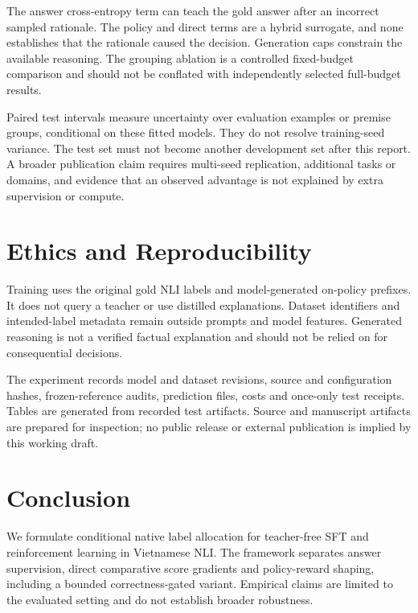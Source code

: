 \documentclass[11pt]{article}
\begin{document}
The answer cross-entropy term can teach the gold answer after an incorrect sampled rationale. The policy and direct terms are a hybrid surrogate, and none establishes that the rationale caused the decision. Generation caps constrain the available reasoning. The grouping ablation is a controlled fixed-budget comparison and should not be conflated with independently selected full-budget results.

Paired test intervals measure uncertainty over evaluation examples or premise groups, conditional on these fitted models. They do not resolve training-seed variance. The test set must not become another development set after this report. A broader publication claim requires multi-seed replication, additional tasks or domains, and evidence that an observed advantage is not explained by extra supervision or compute.

\section{Ethics and Reproducibility}
Training uses the original gold NLI labels and model-generated on-policy prefixes. It does not query a teacher or use distilled explanations. Dataset identifiers and intended-label metadata remain outside prompts and model features. Generated reasoning is not a verified factual explanation and should not be relied on for consequential decisions.

The experiment records model and dataset revisions, source and configuration hashes, frozen-reference audits, prediction files, costs and once-only test receipts. Tables are generated from recorded test artifacts. Source and manuscript artifacts are prepared for inspection; no public release or external publication is implied by this working draft.

\section{Conclusion}
We formulate conditional native label allocation for teacher-free SFT and reinforcement learning in Vietnamese NLI. The framework separates answer supervision, direct comparative score gradients and policy-reward shaping, including a bounded correctness-gated variant.  Empirical claims are limited to the evaluated setting and do not establish broader robustness.
\end{document}
